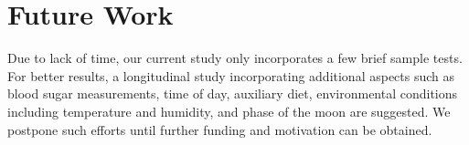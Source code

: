 \section{Future Work}
\label{sec:futurework}

Due to lack of time, our current study only incorporates a few brief sample tests.
For better results, a longitudinal study incorporating additional aspects such as blood sugar measurements, time of day, auxiliary diet, environmental conditions including temperature and humidity, and phase of the moon are suggested.
We postpone such efforts until further funding and motivation can be obtained.
